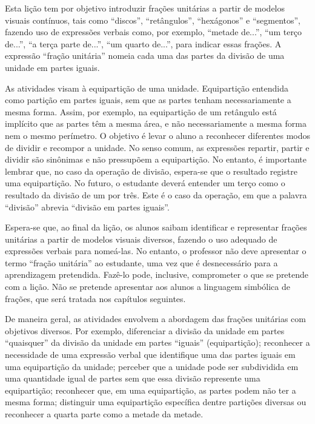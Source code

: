 


\noindent {\color{special}{\Large \bf LIÇÃO 1 - Para o professor}}
\vspace{.5cm}

Esta lição tem por objetivo introduzir frações unitárias a partir de modelos visuais contínuos, tais como ``discos'', ``retângulos'', ``hexágonos'' e ``segmentos'', fazendo uso de expressões verbais como, por exemplo, ``metade de...'', ``um terço de...'', ``a terça parte de...'', ``um quarto de...'', para indicar essas frações.
A expressão ``fração unitária'' nomeia cada uma das partes da divisão de uma unidade em partes iguais.

As atividades visam à equipartição de uma unidade. Equipartição entendida como partição em partes iguais, sem que as partes tenham necessariamente a mesma forma. Assim, por exemplo, na equipartição de um retângulo está implícito que as partes têm a mesma área, e não necessariamente a mesma forma nem o mesmo perímetro. O objetivo é levar o aluno a reconhecer diferentes modos de dividir e recompor a unidade. No senso comum, as expressões repartir, partir e dividir são sinônimas e não pressupõem a equipartição. No entanto, é importante lembrar que, no caso da operação de divisão, espera-se que o resultado registre uma equipartição. No futuro, o estudante deverá entender um terço como o resultado da divisão de um por três. Este é o caso da operação, em que a palavra ``divisão'' abrevia ``divisão em partes iguais''.

Espera-se que, ao final da lição, os alunos saibam identificar e representar frações unitárias a partir de modelos visuais diversos, fazendo o uso adequado de expressões verbais para nomeá-las. No entanto, o professor não deve apresentar o termo ``fração unitária'' ao estudante, uma vez que é desnecessário para a aprendizagem pretendida. Fazê-lo pode, inclusive, comprometer o que se pretende com a lição. Não se pretende apresentar aos alunos a linguagem simbólica de frações, que será tratada nos capítulos seguintes.

De maneira geral, as atividades envolvem a abordagem das frações unitárias com objetivos diversos. Por exemplo, diferenciar a divisão da unidade em partes ``quaisquer'' da divisão da unidade em partes ``iguais'' (equipartição); reconhecer a necessidade de uma expressão verbal que identifique uma das partes iguais em uma equipartição da unidade; perceber que a unidade pode ser subdividida em uma quantidade igual de partes sem que essa divisão represente uma equipartição; reconhecer que, em uma equipartição, as partes podem não ter a mesma forma; distinguir uma equipartição específica dentre partições diversas ou reconhecer a quarta parte como a metade da metade.

